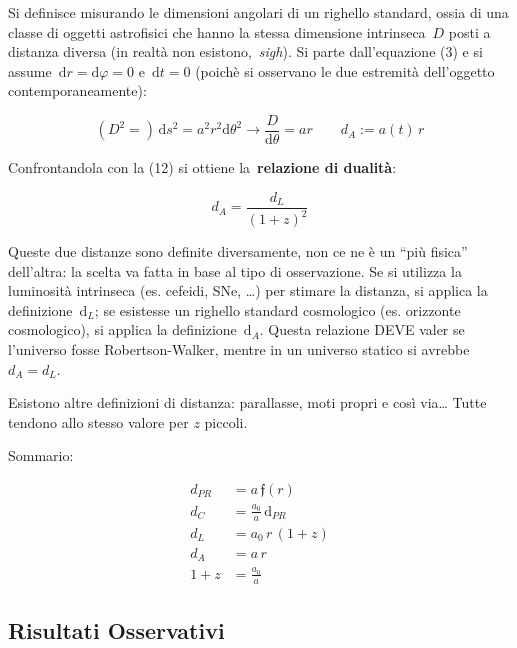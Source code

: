 {\label{564376}}

Si definisce misurando le dimensioni angolari di un righello standard,
ossia di una classe di oggetti astrofisici che hanno la stessa
dimensione intrinseca~\(D\) posti a distanza diversa (in
realtà non esistono,~\emph{sigh}). Si parte dall'equazione (3) e si
assume~\(\mathrm{d}r=\mathrm{d}\varphi = 0\) e~\(\mathrm{d}t=0\) (poichè si osservano le
due estremità dell'oggetto contemporaneamente):

\par\null

\begin{equation}
(D^2=)\, \mathrm{d}s^2=a^2r^2\mathrm{d}\theta^2\rightarrow \frac{D}{\mathrm{d}\theta}=ar\qquad d_A:=a(t)\, r
\end{equation}

Confrontandola con la (12) si ottiene la~\textbf{relazione di dualità}:

\begin{equation}
d_A=\frac{d_L}{(1+z)^2}
\end{equation}

Queste due distanze sono definite diversamente, non ce ne è un ``più
fisica'' dell'altra: la scelta va fatta in base al tipo di osservazione.
Se si utilizza la luminosità intrinseca (es. cefeidi, SNe, \ldots{}) per
stimare la distanza, si applica la definizione~\(\mathrm{d}_L\); se
esistesse un righello standard cosmologico (es. orizzonte cosmologico),
si applica la definizione~\(\mathrm{d}_A\). Questa relazione DEVE
valer se l'universo fosse Robertson-Walker, mentre in un universo
statico si avrebbe~\(d_A=d_L\).~

Esistono altre definizioni di distanza: parallasse, moti propri e così
via\ldots{} Tutte tendono allo stesso valore per \(z\)
piccoli.

\par\null

Sommario:

\begin{align*}
d_{PR} & =a\,\mathfrak{f}(r)  \\ 
d_{C} & =\frac{a_0}{a}\,\mathrm{d}_{PR}  \\ 
d_L & = a_0 \, r\, (1+z)  \\ 
d_A & =a\, r  \\
1+z & =\frac{a_0}{a}
\end{align*}

\par\null

\subsection{Risultati Osservativi}

